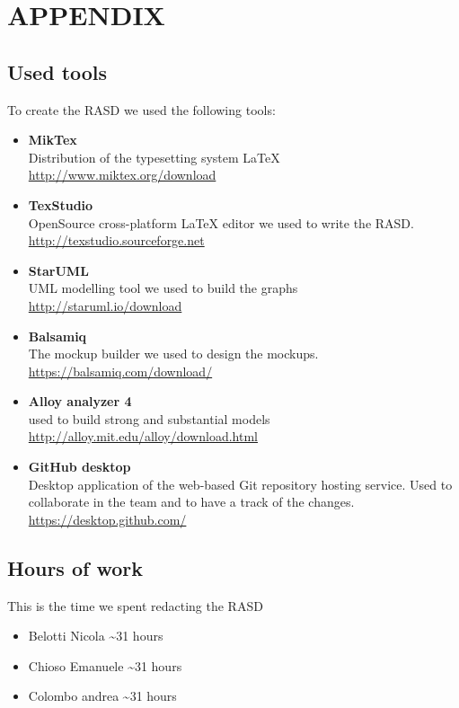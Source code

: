 \section{APPENDIX}
\subsection{Used tools}
To create the RASD we used the following tools:
\begin{itemize}
	\item \textbf{MikTex} \\ Distribution of the typesetting system LaTeX \\ \url{http://www.miktex.org/download } 
	\item \textbf{TexStudio}\\ OpenSource cross-platform LaTeX editor we used to write the RASD. \\ \url{http://texstudio.sourceforge.net  } 
	\item \textbf{StarUML}\\ UML modelling tool we used to build the graphs\\ \url{http://staruml.io/download } 
	\item \textbf{Balsamiq}\\ The mockup builder we used to design the mockups. \\ \url{https://balsamiq.com/download/ } 
	\item \textbf{Alloy analyzer 4}\\ used to build  strong and substantial models \\ \url{ http://alloy.mit.edu/alloy/download.html }
	\item \textbf{GitHub desktop}\\ Desktop application of the web-based Git repository hosting service. Used to collaborate in the team and to have a track of the changes.  \\ \url{https://desktop.github.com/ } 
\end{itemize}

\subsection{Hours of work}
This is the time we spent redacting the RASD
\begin{itemize}
	\item {Belotti Nicola} \textasciitilde 31 hours
	\item {Chioso Emanuele} \textasciitilde 31 hours
	\item {Colombo andrea} \textasciitilde 31 hours
\end{itemize}